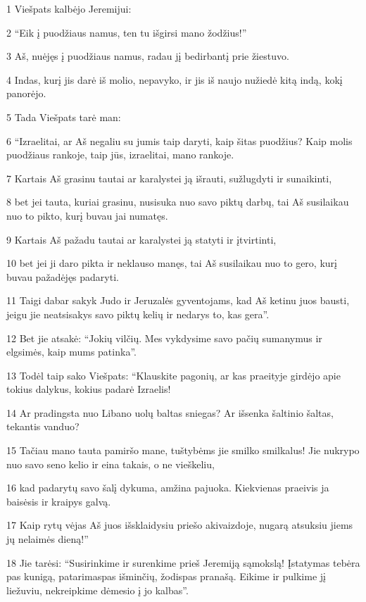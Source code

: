 \par 1 Viešpats kalbėjo Jeremijui: 
\par 2 “Eik į puodžiaus namus, ten tu išgirsi mano žodžius!” 
\par 3 Aš, nuėjęs į puodžiaus namus, radau jį bedirbantį prie žiestuvo. 
\par 4 Indas, kurį jis darė iš molio, nepavyko, ir jis iš naujo nužiedė kitą indą, kokį panorėjo. 
\par 5 Tada Viešpats tarė man: 
\par 6 “Izraelitai, ar Aš negaliu su jumis taip daryti, kaip šitas puodžius? Kaip molis puodžiaus rankoje, taip jūs, izraelitai, mano rankoje. 
\par 7 Kartais Aš grasinu tautai ar karalystei ją išrauti, sužlugdyti ir sunaikinti, 
\par 8 bet jei tauta, kuriai grasinu, nusisuka nuo savo piktų darbų, tai Aš susilaikau nuo to pikto, kurį buvau jai numatęs. 
\par 9 Kartais Aš pažadu tautai ar karalystei ją statyti ir įtvirtinti, 
\par 10 bet jei ji daro pikta ir neklauso manęs, tai Aš susilaikau nuo to gero, kurį buvau pažadėjęs padaryti. 
\par 11 Taigi dabar sakyk Judo ir Jeruzalės gyventojams, kad Aš ketinu juos bausti, jeigu jie neatsisakys savo piktų kelių ir nedarys to, kas gera”. 
\par 12 Bet jie atsakė: “Jokių vilčių. Mes vykdysime savo pačių sumanymus ir elgsimės, kaip mums patinka”. 
\par 13 Todėl taip sako Viešpats: “Klauskite pagonių, ar kas praeityje girdėjo apie tokius dalykus, kokius padarė Izraelis! 
\par 14 Ar pradingsta nuo Libano uolų baltas sniegas? Ar išsenka šaltinio šaltas, tekantis vanduo? 
\par 15 Tačiau mano tauta pamiršo mane, tuštybėms jie smilko smilkalus! Jie nukrypo nuo savo seno kelio ir eina takais, o ne vieškeliu, 
\par 16 kad padarytų savo šalį dykuma, amžina pajuoka. Kiekvienas praeivis ja baisėsis ir kraipys galvą. 
\par 17 Kaip rytų vėjas Aš juos išsklaidysiu priešo akivaizdoje, nugarą atsuksiu jiems jų nelaimės dieną!” 
\par 18 Jie tarėsi: “Susirinkime ir surenkime prieš Jeremiją sąmokslą! Įstatymas tebėra pas kunigą, patarimas­pas išminčių, žodis­pas pranašą. Eikime ir pulkime jį liežuviu, nekreipkime dėmesio į jo kalbas”. 
